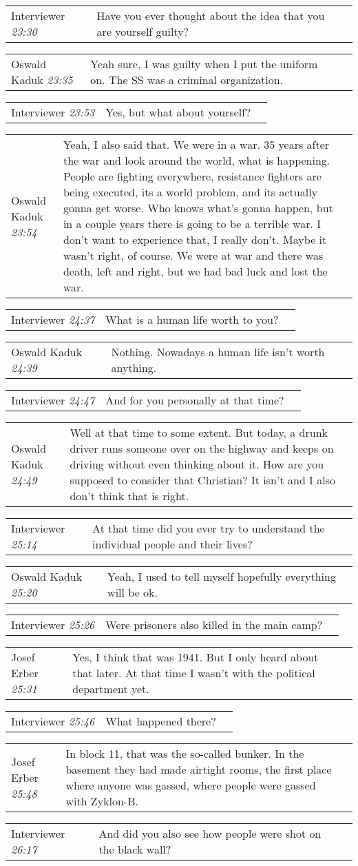 \documentclass{article}
\newcommand{\I}{Interviewer}
\newcommand{\OK}{Oswald Kaduk}
\newcommand{\JE}{Josef Erber}
\newcommand{\dialogueentry}[4]{
    \begin{center}
    \begin{tabular}{p{1in} p{3.5in} p{1.5in}} 
        #2 \newline \textit{#1} & #3 & \small{#4} 
    \end{tabular}
    \end{center}
}
\newcommand{\twolinebreak}{\newline \newline}
\begin{document}
\dialogueentry{23:30}{\I}{Have you ever thought about the idea that you are yourself guilty?}{}

\dialogueentry{23:35}{\OK}{Yeah sure, I was guilty when I put the uniform on. The SS was a criminal organization.}{}

\dialogueentry{23:53}{\I}{Yes, but what about yourself?}{}

\dialogueentry{23:54}{\OK}{Yeah, I also said that. We were in a war. 35 years after the war and look around the world, what is happening. People are fighting everywhere, resistance fighters are being executed, its a world problem, and its actually gonna get worse. Who knows what's gonna happen, but in a couple years there is going to be a terrible war. I don't want to experience that, I really don't. 
\twolinebreak
Maybe it wasn't right, of course. We were at war and there was death, left and right, but we had bad luck and lost the war.}{}

\dialogueentry{24:37}{\I}{What is a human life worth to you?}{}

\dialogueentry{24:39}{\OK}{Nothing. Nowadays a human life isn't worth anything. }{}

\dialogueentry{24:47}{\I}{And for you personally at that time?}{}

\dialogueentry{24:49}{\OK}{Well at that time to some extent. But today, a drunk driver runs someone over on the highway and keeps on driving without even thinking about it. How are you supposed to consider that Christian? It isn't and I also don't think that is right.}{}

\dialogueentry{25:14}{\I}{At that time did you ever try to understand the individual people and their lives?}{}

\dialogueentry{25:20}{\OK}{Yeah, I used to tell myself hopefully everything will be ok.}{}

\dialogueentry{25:26}{\I}{Were prisoners also killed in the main camp?}{}

\dialogueentry{25:31}{\JE}{Yes, I think that was 1941. But I only heard about that later. At that time I wasn't with the political department yet.}{}

\dialogueentry{25:46}{\I}{What happened there?}{}

\dialogueentry{25:48}{\JE}{In block 11, that was the so-called bunker. In the basement they had made airtight rooms, the first place where anyone was gassed, where people were gassed with Zyklon-B.}{}

\dialogueentry{26:17}{\I}{And did you also see how people were shot on the black wall?}{}
\end{document}
